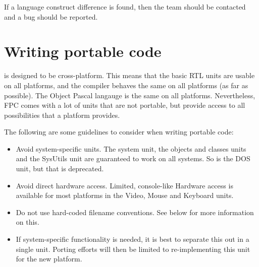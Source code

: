 If a language construct difference is found, then the \fpc team 
should be contacted and a bug should be reported.


\section{Writing portable code}

\fpc is designed to be cross-platform. This means that the basic RTL 
units are usable on all platforms, and the compiler behaves the same 
on all platforms (as far as possible).  The Object Pascal 
langauge is the same on all platforms. Nevertheless, FPC comes with a
lot of units that are not portable, but provide access to all 
possibilities that a platform provides.

The following are some guidelines to consider when writing portable code:
\begin{itemize}
\item Avoid system-specific units. The system unit, the objects and 
classes units and the SysUtils unit are guaranteed to work on all 
systems. So is the DOS unit, but that is deprecated. 
\item Avoid direct hardware access. Limited, console-like Hardware 
access is available for most platforms in the Video, Mouse and  
Keyboard units.
\item Do not use hard-coded filename conventions. 
See below for more information on this.
\item If system-specific functionality is needed, it is best to 
separate this out in a single unit. Porting efforts will then be 
limited to re-implementing this unit for the new platform.
\end{itemize}

